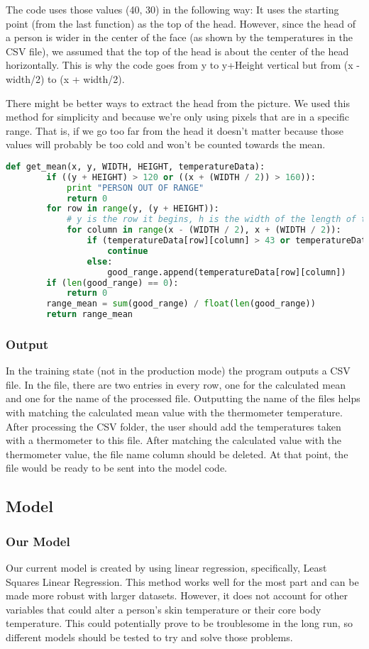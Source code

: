 	The code uses those values (40, 30) in the following way: It uses the starting point (from the last function) as the top of the head. However, since the head of a person is wider in the center of the face (as shown by the temperatures in the CSV file), we assumed that the top of the head is about the center of the head horizontally. This is why the code goes from y to y+Height vertical but from (x - width/2) to (x + width/2). 
	
	There might be better ways to extract the head from the picture. We used this method for simplicity and because we’re only using pixels that are in a specific range. That is, if we go too far from the head it doesn't matter because those values will probably be too cold and won’t be counted towards the mean. 
	\begin{lstlisting}[language=Python, caption=Claculating the mean temperature value]
	def get_mean(x, y, WIDTH, HEIGHT, temperatureData):
		if ((y + HEIGHT) > 120 or ((x + (WIDTH / 2)) > 160)):
			print "PERSON OUT OF RANGE"
			return 0
		for row in range(y, (y + HEIGHT)):
			# y is the row it begins, h is the width of the length of the head
			for column in range(x - (WIDTH / 2), x + (WIDTH / 2)):
				if (temperatureData[row][column] > 43 or temperatureData[row][column] < 35):
					continue
				else:
					good_range.append(temperatureData[row][column])
		if (len(good_range) == 0):
			return 0
		range_mean = sum(good_range) / float(len(good_range))
		return range_mean
	\end{lstlisting}
	
\subsubsection*{Output}
	In the training state (not in the production mode) the program outputs a CSV file. In the file, there are two entries in every row, one for the calculated mean and one for the name of the processed file. Outputting the name of the files helps with matching the calculated mean value with the thermometer temperature. After processing the CSV folder, the user should add the temperatures taken with a thermometer to this file. After matching the calculated value with the thermometer value, the file name column should be deleted. At that point, the file would be ready to be sent into the model code. 
\subsection*{Model}
\subsubsection*{Our Model}
	Our current model is created by using linear regression, specifically, Least Squares Linear Regression. This method works well for the most part and can be made more robust with larger datasets. However, it does not account for other variables that could alter a person’s skin temperature or their core body temperature. This could potentially prove to be troublesome in the long run, so different models should be tested to try and solve those problems.

